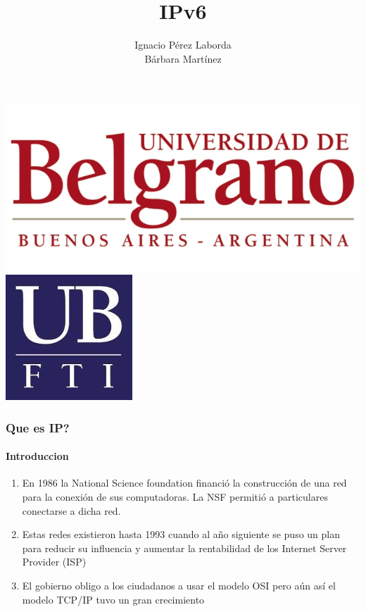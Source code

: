 \documentclass{beamer}
\title[Tecnologia]
{IPv6}
\subtitle{}
\author[Grupo 1] 
{Ignacio P\'erez Laborda\\B\'arbara Mart\'inez}
\institute[UB--FTI] 
{
  Facultad de Tecnolog\'ia Inform\'atica\\
  Universidad de Belgrano
}
\date[\today]
\begin{document}
\begin{frame}

\includegraphics[height=0.2\textheight]{ub2.jpg} \hspace*{6cm}
\includegraphics[height=0.19\textheight]{FTI.jpg}  
\\[-0.1cm]
\titlepage


\end{frame}



\begin{frame}
\frametitle{Que es IP? }
\framesubtitle{Introduccion}
\begin{enumerate}[$*$]
	\item En 1986 la National Science foundation  financió la construcción de una red para la conexión de sus computadoras. La NSF permitió a particulares conectarse a  dicha red.
	\item Estas redes existieron hasta 1993 cuando al año siguiente se puso un plan para reducir su influencia y aumentar la rentabilidad de los Internet Server Provider (ISP)
	\item El gobierno obligo a los ciudadanos a usar el modelo OSI pero aún así el modelo TCP/IP tuvo un gran crecimiento
		
\end{enumerate}
\end{frame}


\end{document}
